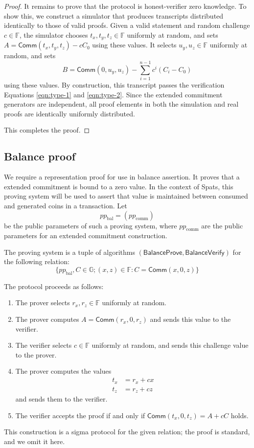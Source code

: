 \documentclass{article}
\newcommand{\G}{\mathbb{G}}
\newcommand{\F}{\mathbb{F}}
\newcommand{\func}[1]{\mathsf{#1}}
\newcommand{\comm}{\func{Comm}}
\begin{document}
\begin{proof}
It remains to prove that the protocol is honest-verifier zero knowledge.
To show this, we construct a simulator that produces transcripts distributed identically to those of valid proofs.
Given a valid statement and random challenge $c \in \F$, the simulator chooses $t_x, t_y, t_z \in \F$ uniformly at random, and sets $A = \comm(t_x, t_y, t_z) - cC_0$ using these values.
It selects $u_y, u_z \in \F$ uniformly at random, and sets
$$B = \comm(0, u_y, u_z) - \sum_{i=1}^{n-1} c^i(C_i - C_0)$$
using these values.
By construction, this transcript passes the verification Equations \ref{eqn:type-1} and \ref{eqn:type-2}.
Since the extended commitment generators are independent, all proof elements in both the simulation and real proofs are identically uniformly distributed.

This completes the proof.
\end{proof}


\subsection{Balance proof}

We require a representation proof for use in balance assertion.
It proves that a extended commitment is bound to a zero value.
In the context of Spats, this proving system will be used to assert that value is maintained between consumed and generated coins in a transaction.
Let $$pp_{\text{bal}} = ( pp_{\text{comm}})$$ be the public parameters of such a proving system, where $pp_{\text{comm}}$ are the public parameters for an extended commitment construction.

The proving system is a tuple of algorithms $(\func{BalanceProve}, \func{BalanceVerify})$ for the following relation:
$$\{ pp_{\text{bal}}, C \in \G ; (x, z) \in \F : C = \comm(x, 0, z) \}$$

The protocol proceeds as follows:
\begin{enumerate}
    \item The prover selects $r_x, r_z \in \F$ uniformly at random.
    \item The prover computes $A = \comm(r_x, 0, r_z)$ and sends this value to the verifier.
    \item The verifier selects $c \in \F$ uniformly at random, and sends this challenge value to the prover.
    \item The prover computes the values
    \begin{align*}
        t_x &= r_x + cx \\
        t_z &= r_z + cz
    \end{align*}
    and sends them to the verifier.
    \item The verifier accepts the proof if and only if $\comm(t_x, 0, t_z) = A + cC$ holds.
\end{enumerate}
This construction is a sigma protocol for the given relation; the proof is standard, and we omit it here.
\end{document}
